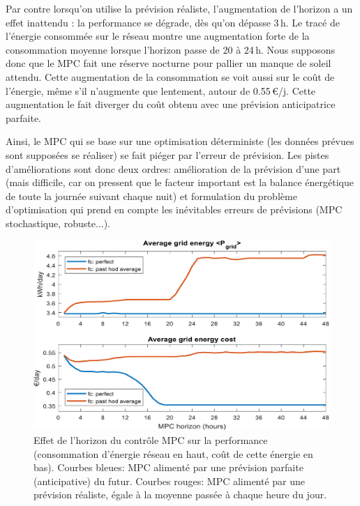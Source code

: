 \documentclass[a4paper,10pt,twocolumn]{article}
\begin{document}
Par contre lorsqu'on utilise la prévision réaliste, l'augmentation
de l'horizon a un effet inattendu : la performance se dégrade,
dès qu'on dépasse 3\,h. 
Le tracé de l'énergie consommée sur le réseau montre une augmentation forte de la consommation moyenne
lorsque l'horizon passe de 20 à 24\,h.
Nous supposons donc que le MPC fait une réserve nocturne pour pallier un manque
de soleil attendu.
Cette augmentation de la consommation se voit aussi sur le coût de l'énergie,
même s'il n'augmente que lentement, autour de 0.55\,€/j.
Cette augmentation le fait diverger du coût obtenu avec une prévision anticipatrice parfaite.

Ainsi, le MPC qui se base sur une optimisation déterministe
(les données prévues sont supposées se réaliser) se fait piéger
par l'erreur de prévision.
Les pistes d'améliorations sont donc deux ordres:
amélioration de la prévision d'une part
(mais difficile, car on pressent que le facteur important est la balance énergétique
de toute la journée suivant chaque nuit)
et formulation du problème d'optimisation qui prend en compte les inévitables
erreurs de prévisions (MPC stochastique, robuste...).

\begin{figure}
        \begin{center}
                \includegraphics[width=1\columnwidth]{figures/MPC_horizon_effect.pdf}
        \end{center}

        \caption{Effet de l'horizon du contrôle MPC sur la performance
        (consommation d'énergie réseau en haut, coût de cette énergie en bas).
        Courbes bleues: MPC alimenté par une prévision parfaite (anticipative) du futur.
        Courbes rouges: MPC alimenté par une prévision réaliste, égale à la moyenne passée à chaque heure du jour. 
        }
        \label{fig:mpc_horiz}
\end{figure}
\end{document}
